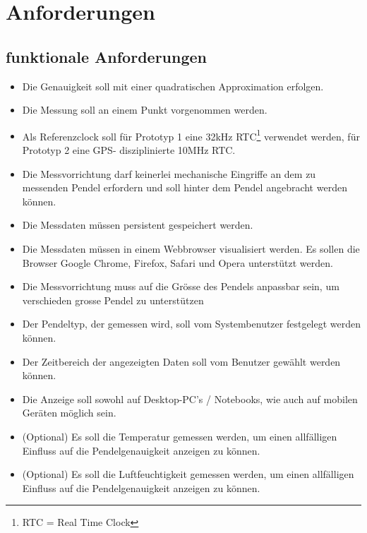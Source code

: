 \section{Anforderungen}
\subsection{funktionale Anforderungen}
	\begin{itemize}
        \item Die Genauigkeit soll mit einer quadratischen Approximation erfolgen.
        \item Die Messung soll an einem Punkt vorgenommen werden.
        \item Als Referenzclock soll für Prototyp 1 eine 32kHz RTC\footnote{RTC = Real Time Clock} verwendet werden, für Prototyp 2 eine GPS- disziplinierte 10MHz RTC.
        \item Die Messvorrichtung darf keinerlei mechanische Eingriffe an dem zu messenden Pendel erfordern und soll hinter dem Pendel angebracht werden können.%
        \item Die Messdaten müssen persistent gespeichert werden.
		\item Die Messdaten müssen in einem Webbrowser visualisiert werden. Es sollen die Browser Google Chrome, Firefox, Safari und Opera unterstützt werden.
		\item Die Messvorrichtung muss auf die Grösse des Pendels anpassbar sein, um verschieden grosse Pendel zu unterstützen
		\item Der Pendeltyp, der gemessen wird, soll vom Systembenutzer festgelegt werden können.
		\item Der Zeitbereich der angezeigten Daten soll vom Benutzer gewählt werden können.
		\item Die Anzeige soll sowohl auf Desktop-PC's / Notebooks, wie auch auf mobilen Geräten möglich sein.
        
		\item (Optional) Es soll die Temperatur gemessen werden, um einen allfälligen Einfluss auf die Pendelgenauigkeit anzeigen zu können.
        \item (Optional) Es soll die Luftfeuchtigkeit gemessen werden, um einen allfälligen Einfluss auf die Pendelgenauigkeit anzeigen zu können.
	\end{itemize}
